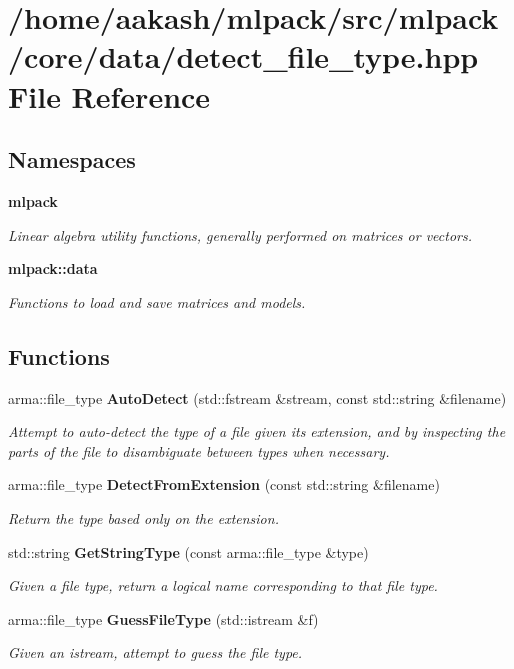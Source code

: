 \section{/home/aakash/mlpack/src/mlpack/core/data/detect\+\_\+file\+\_\+type.hpp File Reference}
\label{detect__file__type_8hpp}
\subsection*{Namespaces}
\begin{DoxyCompactItemize}
\item 
 \textbf{ mlpack}
\begin{DoxyCompactList}\small\item\em Linear algebra utility functions, generally performed on matrices or vectors. \end{DoxyCompactList}\item 
 \textbf{ mlpack\+::data}
\begin{DoxyCompactList}\small\item\em Functions to load and save matrices and models. \end{DoxyCompactList}\end{DoxyCompactItemize}
\subsection*{Functions}
\begin{DoxyCompactItemize}
\item 
arma\+::file\+\_\+type \textbf{ Auto\+Detect} (std\+::fstream \&stream, const std\+::string \&filename)
\begin{DoxyCompactList}\small\item\em Attempt to auto-\/detect the type of a file given its extension, and by inspecting the parts of the file to disambiguate between types when necessary. \end{DoxyCompactList}\item 
arma\+::file\+\_\+type \textbf{ Detect\+From\+Extension} (const std\+::string \&filename)
\begin{DoxyCompactList}\small\item\em Return the type based only on the extension. \end{DoxyCompactList}\item 
std\+::string \textbf{ Get\+String\+Type} (const arma\+::file\+\_\+type \&type)
\begin{DoxyCompactList}\small\item\em Given a file type, return a logical name corresponding to that file type. \end{DoxyCompactList}\item 
arma\+::file\+\_\+type \textbf{ Guess\+File\+Type} (std\+::istream \&f)
\begin{DoxyCompactList}\small\item\em Given an istream, attempt to guess the file type. \end{DoxyCompactList}\end{DoxyCompactItemize}


